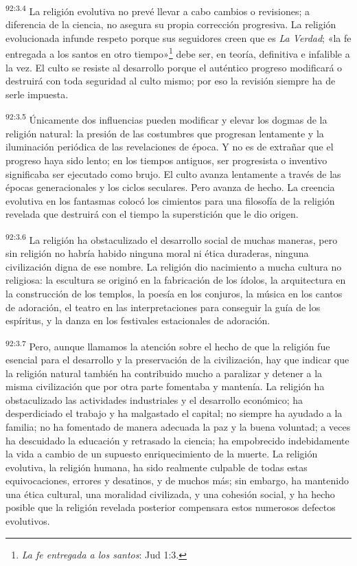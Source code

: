 \par
\textsuperscript{92:3.4} La religión evolutiva no prevé llevar a cabo cambios o revisiones; a diferencia de la ciencia, no asegura su propia corrección progresiva. La religión evolucionada infunde respeto porque sus seguidores creen que es \textit{La Verdad}; «la fe entregada a los santos en otro tiempo»\footnote{\textit{La fe entregada a los santos}: Jud 1:3.} debe ser, en teoría, definitiva e infalible a la vez. El culto se resiste al desarrollo porque el auténtico progreso modificará o destruirá con toda seguridad al culto mismo; por eso la revisión siempre ha de serle impuesta.

\par
\textsuperscript{92:3.5} Únicamente dos influencias pueden modificar y elevar los dogmas de la religión natural: la presión de las costumbres que progresan lentamente y la iluminación periódica de las revelaciones de época. Y no es de extrañar que el progreso haya sido lento; en los tiempos antiguos, ser progresista o inventivo significaba ser ejecutado como brujo. El culto avanza lentamente a través de las épocas generacionales y los ciclos seculares. Pero avanza de hecho. La creencia evolutiva en los fantasmas colocó los cimientos para una filosofía de la religión revelada que destruirá con el tiempo la superstición que le dio origen.

\par
\textsuperscript{92:3.6} La religión ha obstaculizado el desarrollo social de muchas maneras, pero sin religión no habría habido ninguna moral ni ética duraderas, ninguna civilización digna de ese nombre. La religión dio nacimiento a mucha cultura no religiosa: la escultura se originó en la fabricación de los ídolos, la arquitectura en la construcción de los templos, la poesía en los conjuros, la música en los cantos de adoración, el teatro en las interpretaciones para conseguir la guía de los espíritus, y la danza en los festivales estacionales de adoración.

\par
\textsuperscript{92:3.7} Pero, aunque llamamos la atención sobre el hecho de que la religión fue esencial para el desarrollo y la preservación de la civilización, hay que indicar que la religión natural también ha contribuido mucho a paralizar y detener a la misma civilización que por otra parte fomentaba y mantenía. La religión ha obstaculizado las actividades industriales y el desarrollo económico; ha desperdiciado el trabajo y ha malgastado el capital; no siempre ha ayudado a la familia; no ha fomentado de manera adecuada la paz y la buena voluntad; a veces ha descuidado la educación y retrasado la ciencia; ha empobrecido indebidamente la vida a cambio de un supuesto enriquecimiento de la muerte. La religión evolutiva, la religión humana, ha sido realmente culpable de todas estas equivocaciones, errores y desatinos, y de muchos más; sin embargo, ha mantenido una ética cultural, una moralidad civilizada, y una cohesión social, y ha hecho posible que la religión revelada posterior compensara estos numerosos defectos evolutivos.

